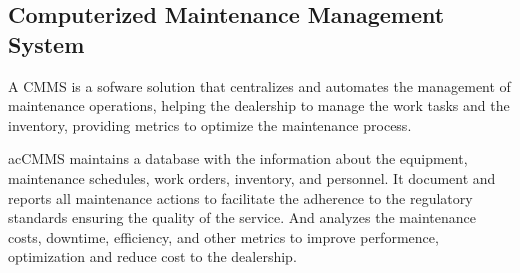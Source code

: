






\subsection{Computerized Maintenance Management System}

A \ac{CMMS} is a sofware solution that centralizes and automates the management of maintenance operations, helping the dealership to manage the work tasks and the inventory, providing metrics to optimize the maintenance process.

ac{CMMS} maintains a database with the information about the equipment, maintenance schedules, work orders, inventory, and personnel. 
It document and reports all maintenance actions to facilitate the adherence to the regulatory standards ensuring the quality of the service. 
And analyzes the maintenance costs, downtime, efficiency, and other metrics to improve performence, optimization and reduce cost to the dealership.

